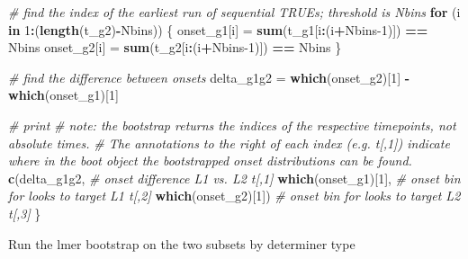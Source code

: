 \documentclass[
]{article}
\newenvironment{Shaded}{\begin{snugshade}}{\end{snugshade}}
\newcommand{\CommentTok}[1]{\textcolor[rgb]{0.56,0.35,0.01}{\textit{#1}}}
\newcommand{\ControlFlowTok}[1]{\textcolor[rgb]{0.13,0.29,0.53}{\textbf{#1}}}
\newcommand{\DecValTok}[1]{\textcolor[rgb]{0.00,0.00,0.81}{#1}}
\newcommand{\FunctionTok}[1]{\textcolor[rgb]{0.13,0.29,0.53}{\textbf{#1}}}
\newcommand{\NormalTok}[1]{#1}
\newcommand{\OtherTok}[1]{\textcolor[rgb]{0.56,0.35,0.01}{#1}}
\newcommand{\SpecialCharTok}[1]{\textcolor[rgb]{0.81,0.36,0.00}{\textbf{#1}}}
\begin{document}
\begin{Shaded}
\begin{Highlighting}[]
  \CommentTok{\# find the index of the earliest run of sequential TRUEs; threshold is Nbins}
  \ControlFlowTok{for}\NormalTok{ (i }\ControlFlowTok{in} \DecValTok{1}\SpecialCharTok{:}\NormalTok{(}\FunctionTok{length}\NormalTok{(t\_g2)}\SpecialCharTok{{-}}\NormalTok{Nbins)) \{}
\NormalTok{    onset\_g1[i] }\OtherTok{=} \FunctionTok{sum}\NormalTok{(t\_g1[i}\SpecialCharTok{:}\NormalTok{(i}\SpecialCharTok{+}\NormalTok{Nbins}\DecValTok{{-}1}\NormalTok{)]) }\SpecialCharTok{==}\NormalTok{ Nbins}
\NormalTok{    onset\_g2[i] }\OtherTok{=} \FunctionTok{sum}\NormalTok{(t\_g2[i}\SpecialCharTok{:}\NormalTok{(i}\SpecialCharTok{+}\NormalTok{Nbins}\DecValTok{{-}1}\NormalTok{)]) }\SpecialCharTok{==}\NormalTok{ Nbins}
\NormalTok{  \}}
  
  \CommentTok{\# find the difference between onsets}
\NormalTok{  delta\_g1g2 }\OtherTok{=} \FunctionTok{which}\NormalTok{(onset\_g2)[}\DecValTok{1}\NormalTok{] }\SpecialCharTok{{-}} \FunctionTok{which}\NormalTok{(onset\_g1)[}\DecValTok{1}\NormalTok{]}
  
  \CommentTok{\# print }
  \CommentTok{\# note: the bootstrap returns the indices of the respective timepoints, not absolute times. }
  \CommentTok{\# The annotations to the right of each index (e.g. t[,1]) indicate where in the boot object the bootstrapped onset distributions can be found.}
  \FunctionTok{c}\NormalTok{(delta\_g1g2,         }\CommentTok{\# onset difference L1 vs. L2 t[,1]}
    \FunctionTok{which}\NormalTok{(onset\_g1)[}\DecValTok{1}\NormalTok{], }\CommentTok{\# onset bin for looks to target L1 t[,2]}
    \FunctionTok{which}\NormalTok{(onset\_g2)[}\DecValTok{1}\NormalTok{])  }\CommentTok{\# onset bin for looks to target L2 t[,3]}
\NormalTok{\}}
\end{Highlighting}
\end{Shaded}

Run the lmer bootstrap on the two subsets by determiner type
\end{document}
